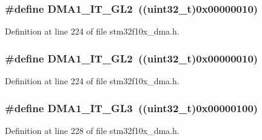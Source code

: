 \subsubsection[{\texorpdfstring{D\+M\+A1\+\_\+\+I\+T\+\_\+\+G\+L2}{DMA1_IT_GL2}}]{\setlength{\rightskip}{0pt plus 5cm}\#define D\+M\+A1\+\_\+\+I\+T\+\_\+\+G\+L2~(({\bf uint32\+\_\+t})0x00000010)}\hypertarget{group___d_m_a__interrupts__definition_ga183f3044b39da5e3b3c688239086f836}{}\label{group___d_m_a__interrupts__definition_ga183f3044b39da5e3b3c688239086f836}


Definition at line 224 of file stm32f10x\+\_\+dma.\+h.

\subsubsection[{\texorpdfstring{D\+M\+A1\+\_\+\+I\+T\+\_\+\+G\+L2}{DMA1_IT_GL2}}]{\setlength{\rightskip}{0pt plus 5cm}\#define D\+M\+A1\+\_\+\+I\+T\+\_\+\+G\+L2~(({\bf uint32\+\_\+t})0x00000010)}\hypertarget{group___d_m_a__interrupts__definition_ga183f3044b39da5e3b3c688239086f836}{}\label{group___d_m_a__interrupts__definition_ga183f3044b39da5e3b3c688239086f836}


Definition at line 224 of file stm32f10x\+\_\+dma.\+h.

\subsubsection[{\texorpdfstring{D\+M\+A1\+\_\+\+I\+T\+\_\+\+G\+L3}{DMA1_IT_GL3}}]{\setlength{\rightskip}{0pt plus 5cm}\#define D\+M\+A1\+\_\+\+I\+T\+\_\+\+G\+L3~(({\bf uint32\+\_\+t})0x00000100)}\hypertarget{group___d_m_a__interrupts__definition_ga3e71e661eb2ebab146b48b3aee5ad9b1}{}\label{group___d_m_a__interrupts__definition_ga3e71e661eb2ebab146b48b3aee5ad9b1}


Definition at line 228 of file stm32f10x\+\_\+dma.\+h.

